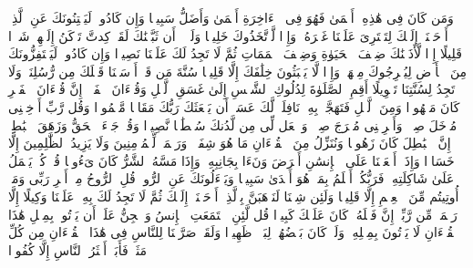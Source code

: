\startbuffer[\q:17:72]
وَمَن كَانَ فِی هَٰذِهِۦۤ أَعۡمَىٰ فَهُوَ فِی ٱلۡءَاخِرَةِ أَعۡمَىٰ وَأَضَلُّ سَبِیلࣰا%
\stopbuffer%
\startbuffer[\q:17:73]
وَإِن كَادُوا۟ لَیَفۡتِنُونَكَ عَنِ ٱلَّذِیۤ أَوۡحَیۡنَاۤ إِلَیۡكَ لِتَفۡتَرِیَ عَلَیۡنَا غَیۡرَهُۥۖ وَإِذࣰا لَّٱتَّخَذُوكَ خَلِیلࣰا%
\stopbuffer%
\startbuffer[\q:17:74]
وَلَوۡلَاۤ أَن ثَبَّتۡنَٰكَ لَقَدۡ كِدتَّ تَرۡكَنُ إِلَیۡهِمۡ شَیۡءࣰا قَلِیلًا%
\stopbuffer%
\startbuffer[\q:17:75]
إِذࣰا لَّأَذَقۡنَٰكَ ضِعۡفَ ٱلۡحَیَوٰةِ وَضِعۡفَ ٱلۡمَمَاتِ ثُمَّ لَا تَجِدُ لَكَ عَلَیۡنَا نَصِیرࣰا%
\stopbuffer%
\startbuffer[\q:17:76]
وَإِن كَادُوا۟ لَیَسۡتَفِزُّونَكَ مِنَ ٱلۡأَرۡضِ لِیُخۡرِجُوكَ مِنۡهَاۖ وَإِذࣰا لَّا یَلۡبَثُونَ خِلَٰفَكَ إِلَّا قَلِیلࣰا%
\stopbuffer%
\startbuffer[\q:17:77]
سُنَّةَ مَن قَدۡ أَرۡسَلۡنَا قَبۡلَكَ مِن رُّسُلِنَاۖ وَلَا تَجِدُ لِسُنَّتِنَا تَحۡوِیلًا%
\stopbuffer%
\startbuffer[\q:17:78]
أَقِمِ ٱلصَّلَوٰةَ لِدُلُوكِ ٱلشَّمۡسِ إِلَىٰ غَسَقِ ٱلَّیۡلِ وَقُرۡءَانَ ٱلۡفَجۡرِۖ إِنَّ قُرۡءَانَ ٱلۡفَجۡرِ كَانَ مَشۡهُودࣰا%
\stopbuffer%
\startbuffer[\q:17:79]
وَمِنَ ٱلَّیۡلِ فَتَهَجَّدۡ بِهِۦ نَافِلَةࣰ لَّكَ عَسَىٰۤ أَن یَبۡعَثَكَ رَبُّكَ مَقَامࣰا مَّحۡمُودࣰا%
\stopbuffer%
\startbuffer[\q:17:80]
وَقُل رَّبِّ أَدۡخِلۡنِی مُدۡخَلَ صِدۡقࣲ وَأَخۡرِجۡنِی مُخۡرَجَ صِدۡقࣲ وَٱجۡعَل لِّی مِن لَّدُنكَ سُلۡطَٰنࣰا نَّصِیرࣰا%
\stopbuffer%
\startbuffer[\q:17:81]
وَقُلۡ جَاۤءَ ٱلۡحَقُّ وَزَهَقَ ٱلۡبَٰطِلُۚ إِنَّ ٱلۡبَٰطِلَ كَانَ زَهُوقࣰا%
\stopbuffer%
\startbuffer[\q:17:82]
وَنُنَزِّلُ مِنَ ٱلۡقُرۡءَانِ مَا هُوَ شِفَاۤءࣱ وَرَحۡمَةࣱ لِّلۡمُؤۡمِنِینَ وَلَا یَزِیدُ ٱلظَّٰلِمِینَ إِلَّا خَسَارࣰا%
\stopbuffer%
\startbuffer[\q:17:83]
وَإِذَاۤ أَنۡعَمۡنَا عَلَى ٱلۡإِنسَٰنِ أَعۡرَضَ وَنَءَا بِجَانِبِهِۦ وَإِذَا مَسَّهُ ٱلشَّرُّ كَانَ یَءُوسࣰا%
\stopbuffer%
\startbuffer[\q:17:84]
قُلۡ كُلࣱّ یَعۡمَلُ عَلَىٰ شَاكِلَتِهِۦ فَرَبُّكُمۡ أَعۡلَمُ بِمَنۡ هُوَ أَهۡدَىٰ سَبِیلࣰا%
\stopbuffer%
\startbuffer[\q:17:85]
وَیَسۡءَلُونَكَ عَنِ ٱلرُّوحِۖ قُلِ ٱلرُّوحُ مِنۡ أَمۡرِ رَبِّی وَمَاۤ أُوتِیتُم مِّنَ ٱلۡعِلۡمِ إِلَّا قَلِیلࣰا%
\stopbuffer%
\startbuffer[\q:17:86]
وَلَئِن شِئۡنَا لَنَذۡهَبَنَّ بِٱلَّذِیۤ أَوۡحَیۡنَاۤ إِلَیۡكَ ثُمَّ لَا تَجِدُ لَكَ بِهِۦ عَلَیۡنَا وَكِیلًا%
\stopbuffer%
\startbuffer[\q:17:87]
إِلَّا رَحۡمَةࣰ مِّن رَّبِّكَۚ إِنَّ فَضۡلَهُۥ كَانَ عَلَیۡكَ كَبِیرࣰا%
\stopbuffer%
\startbuffer[\q:17:88]
قُل لَّئِنِ ٱجۡتَمَعَتِ ٱلۡإِنسُ وَٱلۡجِنُّ عَلَىٰۤ أَن یَأۡتُوا۟ بِمِثۡلِ هَٰذَا ٱلۡقُرۡءَانِ لَا یَأۡتُونَ بِمِثۡلِهِۦ وَلَوۡ كَانَ بَعۡضُهُمۡ لِبَعۡضࣲ ظَهِیرࣰا%
\stopbuffer%
\startbuffer[\q:17:89]
وَلَقَدۡ صَرَّفۡنَا لِلنَّاسِ فِی هَٰذَا ٱلۡقُرۡءَانِ مِن كُلِّ مَثَلࣲ فَأَبَىٰۤ أَكۡثَرُ ٱلنَّاسِ إِلَّا كُفُورࣰا%
\stopbuffer%
\startbuffer[\q:17:90]
